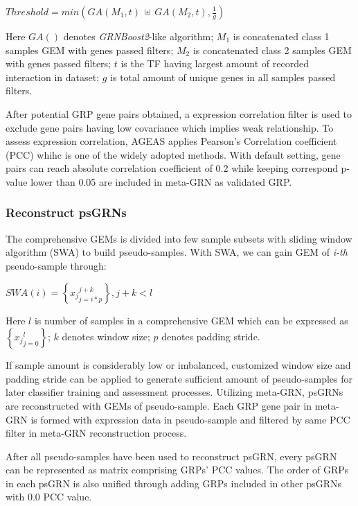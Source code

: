 \documentclass[fleqn,10pt]{wlscirep}
\begin{document}
      \centerline{$Threshold = min(GA(M_1, t)\, \uplus \, GA(M_2, t), \frac{1}{g})$}

      \noindent Here $GA()$ denotes \emph{GRNBoost2}\cite{grnboost2}-like algorithm;
      $M_1$ is concatenated class 1 samples GEM with genes passed filters;
      $M_2$ is concatenated class 2 samples GEM with genes passed filters;
      $t$ is the TF having largest amount of recorded interaction in dataset;
      $g$ is total amount of unique genes in all samples passed filters.

      After potential GRP gene pairs obtained, a expression correlation filter is used to exclude gene pairs having low covariance which implies weak relationship.
      To assess expression correlation, AGEAS applies Pearson's Correlation coefficient\cite{pcc_2012} (PCC) whihc is one of the widely adopted methods.\cite{cid_2019}
      With default setting, gene pairs can reach absolute correlation coefficient of 0.2 while keeping correspond p-value lower than 0.05 are included in meta-GRN as validated GRP.

    \subsubsection*{Reconstruct psGRNs}
      The comprehensive GEMs is divided into few sample subsets with sliding window algorithm (SWA) to build pseudo-samples.
      With SWA, we can gain GEM of \emph{i-th} pseudo-sample through:

      \centerline{$SWA(i) = \left\{{x_j}_{j = i * p}^{j + k}\right\}, j + k < l$}

      \noindent Here $l$ is number of samples in a comprehensive GEM which can be expressed as $\left\{{x_j}_{j = 0}^{l}\right\}$; $k$ denotes window size; $p$ denotes padding stride.

      If sample amount is considerably low or imbalanced, customized window size and padding stride can be applied to generate sufficient amount of pseudo-samples for later classifier training and assessment processes.
      Utilizing meta-GRN, psGRNs are reconstructed with GEMs of pseudo-sample.
      Each GRP gene pair in meta-GRN is formed with expression data in pseudo-sample and filtered by same PCC filter in meta-GRN reconstruction process.

      After all pseudo-samples have been used to reconstruct psGRN, every psGRN can be represented as matrix comprising GRPs' PCC values.
      The order of GRPs in each psGRN is also unified through adding GRPs included in other psGRNs with 0.0 PCC value.
\end{document}

